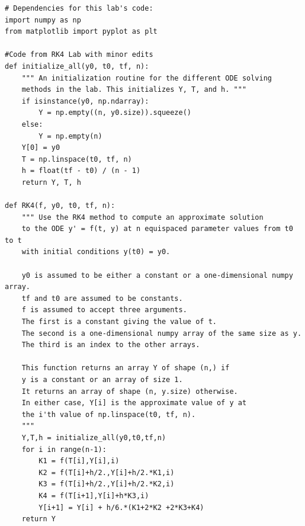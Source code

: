 \begin{lstlisting}
# Dependencies for this lab's code:
import numpy as np
from matplotlib import pyplot as plt

#Code from RK4 Lab with minor edits				
def initialize_all(y0, t0, tf, n):
    """ An initialization routine for the different ODE solving
    methods in the lab. This initializes Y, T, and h. """
    if isinstance(y0, np.ndarray):
        Y = np.empty((n, y0.size)).squeeze()
    else:
        Y = np.empty(n)
    Y[0] = y0
    T = np.linspace(t0, tf, n)
    h = float(tf - t0) / (n - 1)
    return Y, T, h

def RK4(f, y0, t0, tf, n):
    """ Use the RK4 method to compute an approximate solution
    to the ODE y' = f(t, y) at n equispaced parameter values from t0 to t
    with initial conditions y(t0) = y0.
    
    y0 is assumed to be either a constant or a one-dimensional numpy array.
    tf and t0 are assumed to be constants.
    f is assumed to accept three arguments.
    The first is a constant giving the value of t.
    The second is a one-dimensional numpy array of the same size as y.
    The third is an index to the other arrays.
    
    This function returns an array Y of shape (n,) if
    y is a constant or an array of size 1.
    It returns an array of shape (n, y.size) otherwise.
    In either case, Y[i] is the approximate value of y at
    the i'th value of np.linspace(t0, tf, n).
    """
    Y,T,h = initialize_all(y0,t0,tf,n)
    for i in range(n-1):
        K1 = f(T[i],Y[i],i)
        K2 = f(T[i]+h/2.,Y[i]+h/2.*K1,i)
        K3 = f(T[i]+h/2.,Y[i]+h/2.*K2,i)
        K4 = f(T[i+1],Y[i]+h*K3,i)
        Y[i+1] = Y[i] + h/6.*(K1+2*K2 +2*K3+K4)
    return Y
\end{lstlisting}

